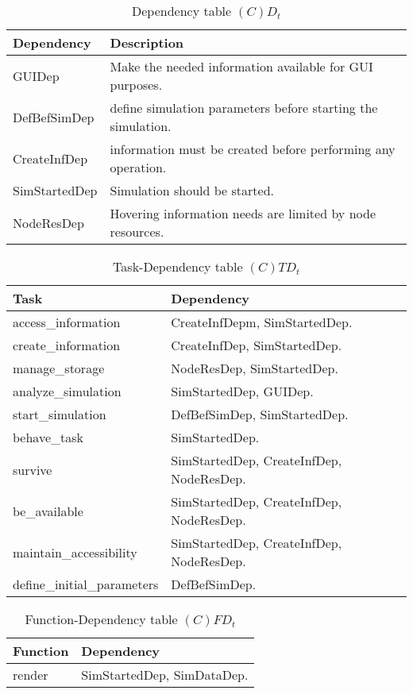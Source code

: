 \begin{table}[H]
	\centering
	\begin{tabular}{|p{4cm}|p{8cm}|}
			\hline
			\textbf{Dependency} & \textbf{Description} \\
			\hline
			GUIDep & Make the needed information available for GUI purposes. \\
			\hline
			DefBefSimDep & define simulation parameters before starting the
			simulation. \\
			\hline
			CreateInfDep & information must be created before performing any
			operation. \\
			\hline
			SimStartedDep & Simulation should be started. \\
			\hline
			NodeResDep & Hovering information needs are limited by node resources. \\
			\hline
		\end{tabular}
	\caption{Dependency table $(C)D_t$}
	\label{tab:cdt}
\end{table}

\begin{table}[H]
	\centering
	\begin{tabular}{|p{5cm}|p{7cm}|}
			\hline
			\textbf{Task} & \textbf{Dependency} \\
			\hline
			access\_information & CreateInfDepm, SimStartedDep.\\
			\hline
			create\_information & CreateInfDep, SimStartedDep. \\
			\hline
			manage\_storage & NodeResDep, SimStartedDep. \\
			\hline
			analyze\_simulation & SimStartedDep, GUIDep.\\
			\hline
			start\_simulation & DefBefSimDep, SimStartedDep. \\
			\hline
			behave\_task & SimStartedDep. \\
			\hline
			survive & SimStartedDep, CreateInfDep, NodeResDep. \\
			\hline
			be\_available & SimStartedDep, CreateInfDep, NodeResDep. \\
			\hline
			maintain\_accessibility & SimStartedDep, CreateInfDep, NodeResDep. \\
			\hline
			define\_initial\_parameters & DefBefSimDep. \\
			\hline
		\end{tabular}
	\caption{Task-Dependency table $(C)TD_t$}
	\label{tab:ctdt}
\end{table}

\begin{table}[H]
	\centering
	\begin{tabular}{|p{5cm}|p{7cm}|}
			\hline
			\textbf{Function} & \textbf{Dependency} \\
			\hline
			render & SimStartedDep, SimDataDep. \\
			\hline
		\end{tabular}
	\caption{Function-Dependency table $(C)FD_t$}
	\label{tab:cfdt}
\end{table}

